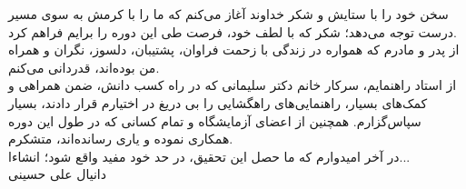 \thispagestyle{empty}

{\nastaliq
سخن خود را با ستایش و شکر خداوند آغاز می‌کنم که ما را با کرمش به سوی مسیر درست توجه می‌دهد؛ شکر که با لطف خود، فرصت طی این دوره را برایم فراهم کرد.
\\
از پدر و مادرم که همواره در زندگی با زحمت فراوان، پشتیبان، دلسوز، نگران و همراه من بوده‌اند، قدردانی می‌کنم.
\\
از استاد راهنمایم، سرکار خانم دکتر سلیمانی که در راه کسب دانش، ضمن همراهی و کمک‌های بسیار، راهنمایی‌های راهگشایی را بی دریغ در اختیارم قرار دادند، بسیار سپاس‌گزارم.
همچنین از اعضای آزمایشگاه و تمام کسانی که در طول این دوره همکاری نموده و یاری رسانده‌اند، متشکرم.
\\
در آخر امیدوارم که ما حصل این تحقیق، در حد خود مفید واقع شود؛ انشاءا...
\\


\vspace{1cm}
دانیال علی حسینی
}
\newpage\clearpage